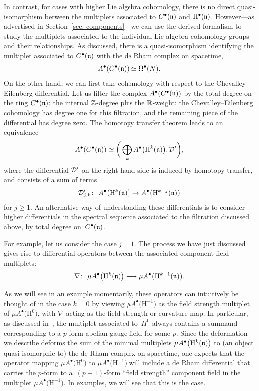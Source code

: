 \documentclass[pdftex]{sigma}
\numberwithin{equation}{section}
\def\bu{\bullet}
\begin{document}
In contrast, for cases with higher Lie algebra cohomology, there is no direct quasi-isomorphism between the multiplets associated to $C^\bullet(\mathfrak n)$ and $\mathrm H^\bullet(\mathfrak n)$. However---as advertised in Section~\ref{sec: components}---we can use the derived formalism to study the multiplets associated to the individual Lie algebra cohomology groups and their relationships. As discussed, there is a quasi-isomorphism identifying the multiplet associated to $C^\bullet(\mathfrak n)$ with the de Rham complex on spacetime,
\begin{equation*}
A^\bullet(C^\bullet(\mathfrak n)) \simeq \Omega^\bullet(N) .
\end{equation*}
On the other hand, we can first take cohomology with respect to the Chevalley--Eilenberg differential. Let us filter the complex $A^\bullet(C^\bullet(\mathfrak n))$ by the total degree on the ring $C^\bullet(\mathfrak n)$: the internal $\mathbb Z$-degree plus the $\mathbb R$-weight: the Chevalley--Eilenberg cohomology has degree one for this filtration, and the remaining piece of the differential has degree zero. The homotopy transfer theorem leads to an equivalence
\begin{equation*}
A^\bullet(C^\bullet(\mathfrak n)) \simeq \bigg( \bigoplus_k A^\bullet\big(\mathrm H^k(\mathfrak n)\big) , \mathcal D' \bigg) ,
\end{equation*}
where the differential $\mathcal D'$ on the right hand side is induced by homotopy transfer, and consists of a sum of terms
\begin{equation*}
\mathcal D'_{j,k} \colon \ A^\bullet\big(\mathrm H^k(\mathfrak n)\big) \to A^\bullet\big(\mathrm H^{k-j}(\mathfrak n)\big)
\end{equation*}
for $j \ge 1$. An alternative way of understanding these differentials is to consider higher differentials in the spectral sequence associated to the filtration discussed above, by total degree on~$C^\bullet(\mathfrak n)$.

For example, let us consider the case $j=1$. The process we have just discussed gives rise to differential operators between the associated component field multiplets:
\begin{equation*}
\nabla \colon \ \mu A^\bullet\big(\mathrm H^k(\mathfrak n)\big) \longrightarrow \mu A^\bullet\big(\mathrm H^{k-1}(\mathfrak n)\big) .
\end{equation*}

As we will see in an example momentarily, these operators can intuitively be thought of in the case $k=0$ by viewing $\mu A^\bullet\big(\mathrm H^{-1}\big)$ as the field strength multiplet of $\mu A^\bullet\big(\mathrm H^0\big)$, with $\nabla$ acting as the field strength or curvature map.
In particular, as discussed in~\cite{perspectives}, the multiplet associated to~$H^0$ always contains a summand corresponding to a $p$-form abelian gauge field for some $p$. Since the deformation we describe deforms the sum of the minimal multiplets $\mu A^\bu\big(\mathrm H^k(\fn)\big)$ to (an object quasi-isomorphic to) the de Rham complex on spacetime, one expects that the operator mapping $\mu A^\bu\big(\mathrm H^0\big)$ to $\mu A^\bu\big(\mathrm H^{-1}\big)$ will include a de Rham differential that carries the $p$-form to a~$(p+1)$-form ``field strength'' component field in the multiplet $\mu A^\bu\big(\mathrm H^{-1}\big)$. In examples, we will see that this is the case.
\end{document}

